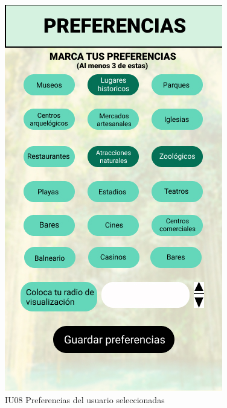 \begin{figure}[h]
    \begin{minipage}{0.5\textwidth}
        \centering
        \includegraphics[width=.7\linewidth]{Pantallas Prototipo3/IU08-Preferencias del usuario.jpg}
        \caption{IU08 Preferencias del usuario seleccionadas}
    \end{minipage}%
\end{figure}

